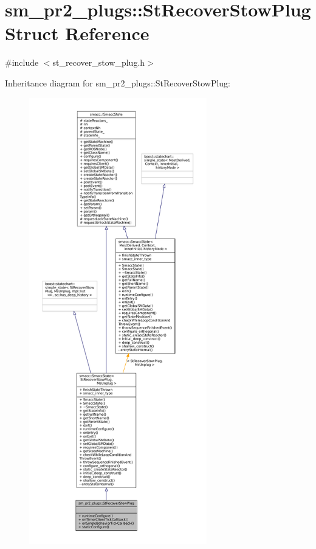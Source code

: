 \hypertarget{structsm__pr2__plugs_1_1StRecoverStowPlug}{}\section{sm\+\_\+pr2\+\_\+plugs\+:\+:St\+Recover\+Stow\+Plug Struct Reference}
\label{structsm__pr2__plugs_1_1StRecoverStowPlug}


{\ttfamily \#include $<$st\+\_\+recover\+\_\+stow\+\_\+plug.\+h$>$}



Inheritance diagram for sm\+\_\+pr2\+\_\+plugs\+:\+:St\+Recover\+Stow\+Plug\+:
\nopagebreak
\begin{figure}[H]
\begin{center}
\leavevmode
\includegraphics[height=550pt]{structsm__pr2__plugs_1_1StRecoverStowPlug__inherit__graph}
\end{center}
\end{figure}


